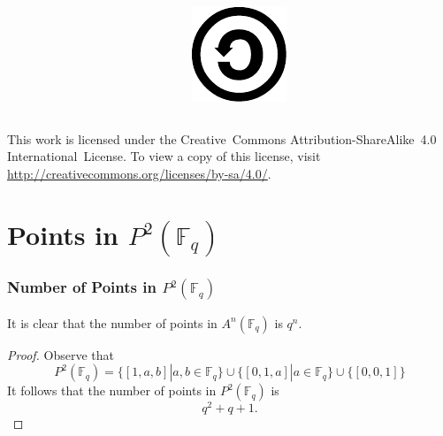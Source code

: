 \documentclass{beamer}
\begin{document}
\begin{frame}
\begin{columns}[T]
\begin{column}[T]{.2\textwidth}
            \end{column}
            \begin{column}[T]{.2\textwidth}
                \centering
                \includegraphics[width=\textwidth]{sa.pdf}
            \end{column}
        \end{columns}
        \vfill
        This work is licensed under the
        Creative~Commons Attribution-ShareAlike~4.0 International~License.
        To view a copy of this license, visit
        \url{http://creativecommons.org/licenses/by-sa/4.0/}.
    \end{frame}

    \section{Points in \(P^2(\mathbb{F}_q)\)}
    \begin{frame}[label=points]
        \frametitle{Number of Points in \(P^2(\mathbb{F}_q)\)}
        It is clear that the number of points in \(A^n(\mathbb{F}_q)\)
        is \(q^n\).
        \vfill
        \begin{proof}
            Observe that
            \[P^2(\mathbb{F}_q) = \{[1, a, b] | a, b \in \mathbb{F}_q\}
                \cup \{[0, 1, a] | a \in \mathbb{F}_q\}
                \cup \{[0, 0, 1]\}\]
            It follows that the number of points in \(P^2(\mathbb{F}_q)\)
            is \[q^2 + q + 1.\]
        \end{proof}
        \hyperlink{projective}{}
    \end{frame}
\end{document}
